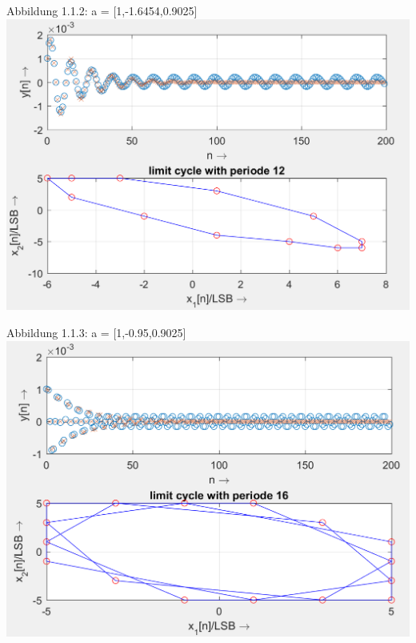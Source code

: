 \begin{center}
Abbildung 1.1.2: a = [1,-1.6454,0.9025]\\
\includegraphics[scale=0.9]{../Tab1_2.PNG}
\end{center}

\newpage

\begin{center}
Abbildung 1.1.3: a = [1,-0.95,0.9025]\\
\includegraphics[scale=0.9]{../Tab1_3.PNG}
\end{center}

